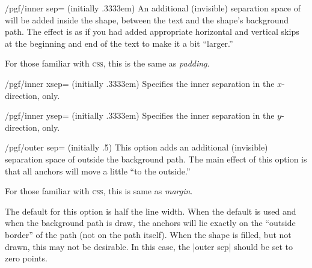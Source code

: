 \begin{key}{/pgf/inner sep= (initially .3333em)}
  An additional (invisible) separation space of  will
  be added inside the shape, between the text and the shape's
  background path. The effect is as if you had added appropriate
  horizontal and vertical skips at the beginning and end of the text
  to make it a bit ``larger.''

  For those familiar with \textsc{css}, this is the same as
  \emph{padding}.

\begin{codeexample}[]
\end{codeexample}
\end{key}

\begin{key}{/pgf/inner xsep= (initially .3333em)}
  Specifies the inner separation in the $x$-direction, only.
\end{key}

\begin{key}{/pgf/inner ysep= (initially .3333em)}
  Specifies the inner separation in the $y$-direction, only.
\end{key}

\begin{key}{/pgf/outer sep= (initially .5\string\pgflinewidth)}
  This option adds an additional (invisible) separation space of
   outside the background path. The main effect of
  this option is that all anchors will move a little ``to the
  outside.''

  For those familiar with \textsc{css}, this is same as \emph{margin}.

  The default for this option is half the line width. When the default
  is used and when the background path is draw, the anchors will lie
  exactly on the ``outside border'' of the path (not on the path
  itself). When the shape is filled, but not drawn, this may not be
  desirable. In this case, the |outer sep| should be set to zero
  points. 
\begin{codeexample}[]
\end{codeexample}
\end{key}

